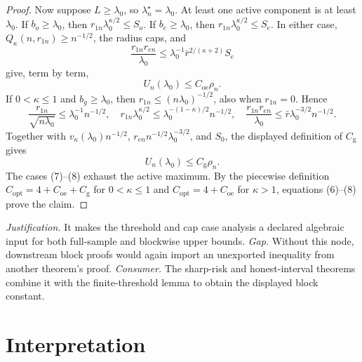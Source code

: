 \documentclass{article}
\begin{document}
\begin{proof}
Now suppose \(L\geq\lambda_0\), so \(\lambda_n^\star=\lambda_0\).  At least one active component is at least \(\lambda_0\).  If \(b_o\geq\lambda_0\), then \(r_{1n}\lambda_0^{\kappa/2}\leq S_o\).  If \(b_e\geq\lambda_0\), then \(r_{1n}\lambda_0^{\kappa/2}\leq S_e\).  In either case, \(Q_\kappa(n,r_{1n})\geq n^{-1/2}\), the radius caps, and
\[
\frac{r_{1n}r_{en}}{\lambda_0}
\leq\lambda_0^{-1}\bar r^{2/(\kappa+2)}S_e
\]
give, term by term,
\[
U_n(\lambda_0)\leq C_{\mathrm{oe}}\rho_n. \tag{7}
\]
If \(0<\kappa\leq1\) and \(b_g\geq\lambda_0\), then
\(r_{1n}\leq(n\lambda_0)^{-1/2}\), also when \(r_{1n}=0\).  Hence
\[
\frac{r_{1n}}{\sqrt{n\lambda_0}}\leq\lambda_0^{-1}n^{-1/2},\quad
r_{1n}\lambda_0^{\kappa/2}\leq
\lambda_0^{-(1-\kappa)/2}n^{-1/2},\quad
\frac{r_{1n}r_{en}}{\lambda_0}\leq
\bar r\lambda_0^{-3/2}n^{-1/2}.
\]
Together with
\(v_\kappa(\lambda_0)n^{-1/2}\),
\(r_{en}n^{-1/2}\lambda_0^{-3/2}\), and \(S_0\), the displayed definition of \(C_{\mathrm g}\) gives
\[
U_n(\lambda_0)\leq C_{\mathrm g}\rho_n. \tag{8}
\]
The cases (7)--(8) exhaust the active maximum.  By the piecewise definition
\(C_{\mathrm{opt}}=4+C_{\mathrm{oe}}+C_{\mathrm g}\) for \(0<\kappa\leq1\) and \(C_{\mathrm{opt}}=4+C_{\mathrm{oe}}\) for \(\kappa>1\), equations (6)--(8) prove the claim.
\end{proof}
\par\smallskip\noindent \textit{Justification.} It makes the threshold and cap case analysis a declared algebraic input for both full-sample and blockwise upper bounds. \textit{Gap.} Without this node, downstream block proofs would again import an unexported inequality from another theorem's proof. \textit{Consumer.} The sharp-risk and honest-interval theorems combine it with the finite-threshold lemma to obtain the displayed block constant.

\section{Interpretation}
\end{document}
